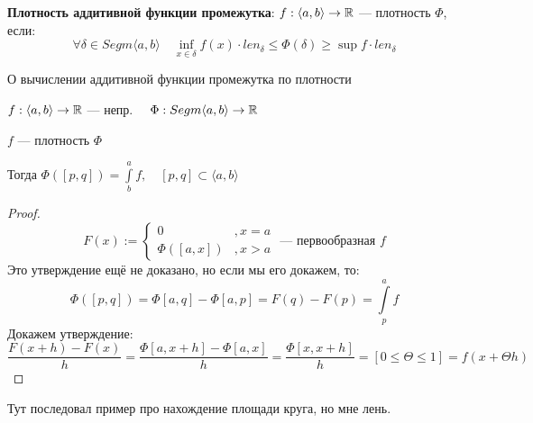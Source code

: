 \begin{definition}
    \textbf{Плотность аддитивной функции промежутка}: $f:\langle a,b\rangle \to\mathbb{R}$ --- плотность $\Phi$, если:
    $$\forall \delta\in Segm\langle a,b\rangle \quad \inf\limits_{x\in\delta} f(x)\cdot len_\delta\leq \Phi(\delta)\geq\sup f \cdot len_\delta$$
\end{definition}

\begin{theorem}
    О вычислении аддитивной функции промежутка по плотности

    $f:\langle a,b\rangle \to \mathbb{R}$ --- непр. $\quad \Phi : Segm\langle a,b\rangle\to\mathbb{R}$

    $f$ --- плотность $\Phi$

    Тогда $\Phi([p,q])=\int\limits_b^a f, \quad [p,q]\subset \langle a,b\rangle$
\end{theorem}
\begin{proof}
    $$F(x):=\begin{cases}
        0 &, x=a \\
        \Phi([a,x]) &, x>a
    \end{cases} \text{ --- первообразная } f$$
    Это утверждение ещё не доказано, но если мы его докажем, то:
    $$\Phi([p,q])=\Phi[a,q]-\Phi[a,p]=F(q)-F(p)=\int\limits_p^af$$
    Докажем утверждение:
    $$\frac{F(x+h)-F(x)}{h}=\frac{\Phi[a,x+h]-\Phi[a,x]}{h}=\frac{\Phi[x,x+h]}{h}=[0\leq\Theta\leq1]=f(x+\Theta h)$$
\end{proof}

Тут последовал пример про нахождение площади круга, но мне лень.

